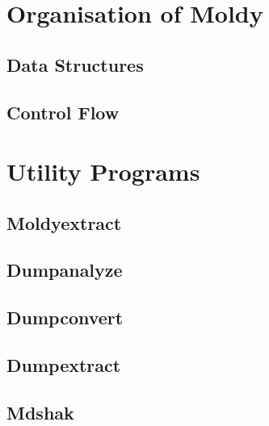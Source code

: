 \chapter{Organisation of Moldy}
\section{Data Structures}
\label{sec:structs}
\section{Control Flow}

\chapter{Utility Programs}
\section{Moldyextract}
\section{Dumpanalyze}
\section{Dumpconvert}
\label{sec:dumpconvert}
\section{Dumpextract}
\section{Mdshak}





